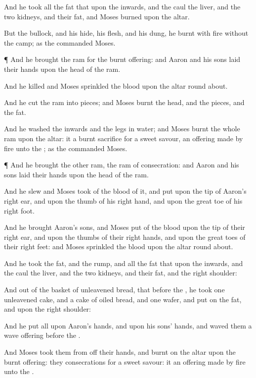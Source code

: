 {And he
took all the
fat that
{} upon the
inwards, and the
caul
{} the
liver, and the
two
kidneys, and their
fat, and
Moses
burned
{} upon the
altar.

But the
bullock, and his
hide, his
flesh, and his
dung, he
burnt with
fire
without the
camp; as the
{}
commanded
Moses.


\par }{\PP {}¶ And he
brought the
ram for the burnt
offering: and
Aaron and his
sons
laid their
hands upon the
head of the
ram.

And he
killed
{} and
Moses
sprinkled the
blood upon the
altar round
about.

And he
cut the
ram into
pieces; and
Moses
burnt the
head, and the
pieces, and the
fat.

And he
washed the
inwards and the
legs in
water; and
Moses
burnt the whole
ram upon the
altar: it
{} a burnt
sacrifice for a
sweet
savour,
{} an offering made by
fire unto the
{}; as the
{}
commanded
Moses.


\par }{\PP {}¶ And he
brought the
other
ram, the
ram of
consecration: and
Aaron and his
sons
laid their
hands upon the
head of the
ram.

And he
slew
{} and
Moses
took of the
blood of it, and
put
{} upon the
tip of
Aaron’s
right
ear, and upon the
thumb of his
right
hand, and upon the great
toe of his
right
foot.

And he
brought
Aaron’s
sons, and
Moses
put of the
blood upon the
tip of their
right
ear, and upon the
thumbs of their
right
hands, and upon the great
toes of their
right
feet: and
Moses
sprinkled the
blood upon the
altar round
about.

And he
took the
fat, and the
rump, and all the
fat that
{} upon the
inwards, and the
caul
{} the
liver, and the
two
kidneys, and their
fat, and the
right
shoulder:

And out of the
basket of
unleavened
bread, that
{}
before the
{}, he
took
one
unleavened
cake, and a
cake of
oiled bread, and
one
wafer, and
put
{} on the
fat, and upon the
right
shoulder:

And he
put all upon
Aaron’s
hands, and upon his
sons’
hands, and
waved them
{} a wave
offering
before the
{}.

And
Moses
took them from off their
hands, and
burnt
{} on the
altar upon the burnt
offering: they
{}
consecrations for a
sweet
savour: it
{} an offering made by
fire unto the
{}.

}

